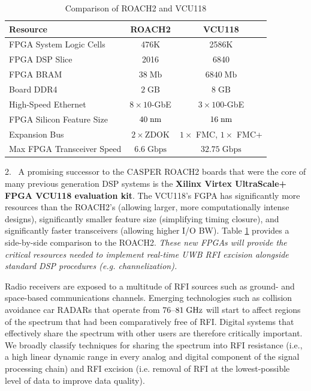 \documentclass[10pt]{myNSF}
\begin{document}
\begin{table}
  \vspace{-2em}
  \centering
  \caption{Comparison of ROACH2 and VCU118 \label{table:fpgas}}
  \begin{tabular}{|l|c|c|}
    \hline
    Resource & ROACH2 & VCU118 \\
    \hline
    FPGA System Logic Cells & 476K & 2586K \\
    FPGA DSP Slice & 2016 & 6840 \\
    FPGA BRAM & $38\; \mathrm{Mb}$ & $6840\; \mathrm{Mb}$ \\
    Board DDR4 & $2\; \mathrm{GB}$ & $8\; \mathrm{GB}$ \\
    High-Speed Ethernet & $8 \times 10$-GbE & $3 \times 100$-GbE \\
    FPGA Silicon Feature Size & $40\; \textrm{nm}$ & $16\; \textrm{nm}$ \\
    Expansion Bus & $2 \times \mathrm{ZDOK}$ & $1 \times$ FMC, $1 \times$ FMC+ \\
    Max FPGA Transceiver Speed & $6.6\; \mathrm{Gbps}$ & $32.75\; \mathrm{Gbps}$ \\
    \hline
  \end{tabular}
\end{table}
2.~ A promising successor to the CASPER ROACH2 boards that were the
core of many previous generation DSP systems is the \textbf{Xilinx
  Virtex UltraScale+ FPGA VCU118 evaluation kit}.  The VCU118's FGPA
has significantly more resources than the ROACH2's (allowing larger,
more computationally intense designs), significantly smaller feature
size (simplifying timing closure), and significantly faster
transceivers (allowing higher I/O BW).  Table \ref{table:fpgas}
provides a side-by-side comparison to the ROACH2.  \emph{These new
  FPGAs will provide the critical resources needed to implement
  real-time UWB RFI excision alongside standard DSP procedures
  (e.g. channelization).}

\label{sec:spectrum}

Radio receivers are exposed to a multitude of RFI sources such as
ground- and space-based communications channels.
Emerging technologies such as collision avoidance car RADARs that
operate from $76$--$81\; \textrm{GHz}$ will start to affect regions of the
spectrum that had been comparatively free of RFI.  Digital systems
that effectively share the spectrum with other users are therefore
critically important.  We broadly classify techniques for sharing the
spectrum into RFI resistance (i.e., a high linear dynamic range in
every analog and digital component of the signal processing chain) and
RFI excision (i.e. removal of RFI at the lowest-possible level of data
to improve data quality).
\end{document}
